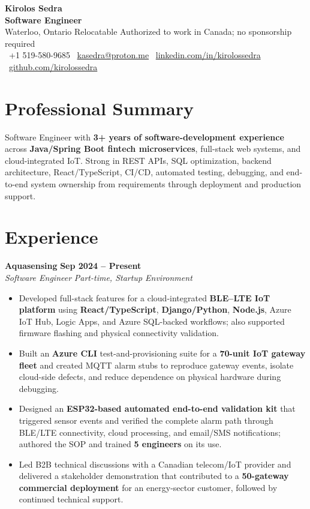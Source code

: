 \documentclass[letterpaper,11pt]{article}
\newcommand{\resumeSubheading}[4]{
  \textbf{#1} \hfill \textbf{#2} \\
  \textit{#3} \hfill \textit{#4} \\
}
\newcommand{\linksep}{\hspace{0.35em}\textbar\hspace{0.35em}}
\begin{document}
\begin{center}
    {\LARGE \textbf{Kirolos Sedra}} \\
    \textbf{Software Engineer} \\
    Waterloo, Ontario \textbar{} Relocatable \textbar{} Authorized to work in Canada; no sponsorship required \\
    \faPhone\ +1 519-580-9685 \linksep
    \faEnvelope\ \href{mailto:kasedra@proton.me}{kasedra@proton.me} \linksep
    \faLinkedin\ \href{https://linkedin.com/in/kirolossedra}{linkedin.com/in/kirolossedra} \linksep
    \faGithub\ \href{https://github.com/kirolossedra}{github.com/kirolossedra}
\end{center}

\vspace{-5pt}

\section{Professional Summary}

Software Engineer with \textbf{3+ years of software-development experience} across \textbf{Java/Spring Boot fintech microservices}, full-stack web systems, and cloud-integrated IoT. Strong in REST APIs, SQL optimization, backend architecture, React/TypeScript, CI/CD, automated testing, debugging, and end-to-end system ownership from requirements through deployment and production support.

\section{Experience}

\resumeSubheading
{Aquasensing}{Sep 2024 -- Present}
{Software Engineer}{Part-time, Startup Environment}
\begin{itemize}
    \item Developed full-stack features for a cloud-integrated \textbf{BLE--LTE IoT platform} using \textbf{React/TypeScript}, \textbf{Django/Python}, \textbf{Node.js}, Azure IoT Hub, Logic Apps, and Azure SQL-backed workflows; also supported firmware flashing and physical connectivity validation.
    \item Built an \textbf{Azure CLI} test-and-provisioning suite for a \textbf{70-unit IoT gateway fleet} and created MQTT alarm stubs to reproduce gateway events, isolate cloud-side defects, and reduce dependence on physical hardware during debugging.
    \item Designed an \textbf{ESP32-based automated end-to-end validation kit} that triggered sensor events and verified the complete alarm path through BLE/LTE connectivity, cloud processing, and email/SMS notifications; authored the SOP and trained \textbf{5 engineers} on its use.
    \item Led B2B technical discussions with a Canadian telecom/IoT provider and delivered a stakeholder demonstration that contributed to a \textbf{50-gateway commercial deployment} for an energy-sector customer, followed by continued technical support.
\end{itemize}
\end{document}
